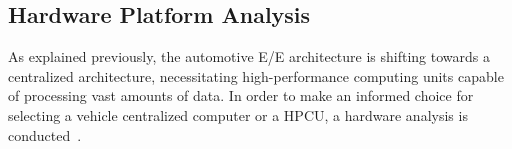     

    
    \subsection{Hardware Platform Analysis}
    
    As explained previously, the automotive E/E architecture is shifting towards a centralized architecture, necessitating high-performance computing units capable of processing vast amounts of data. In order to make an informed choice for selecting a vehicle centralized computer or a HPCU, a hardware analysis is conducted~\cite{9613692, askaripoor2022architecture}.




    
    
    

